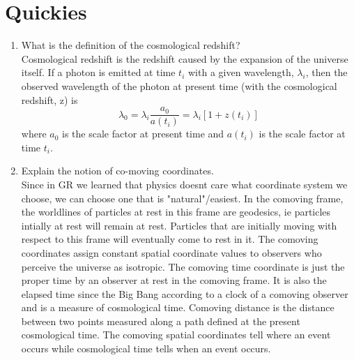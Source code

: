 	\section{Quickies}

\begin{enumerate}[label=(\alph*)]
	\item What is the definition of the cosmological redshift? \\
		Cosmological redshift is the redshift caused by the expansion of the universe itself. If a photon is emitted at time $t_i$ with a given wavelength, $\lambda_i$, then the observed wavelength of the photon at present time (with the cosmological redshift, z) is 
		\begin{equation}
			\lambda_0 = \lambda_i \frac{a_0}{a(t_i)} = \lambda_i \left[ 1 + z(t_i) \right]
		\end{equation}
where $a_0$ is the scale factor at present time and $a(t_i)$ is the scale factor at time $t_i$.

	\item Explain the notion of co-moving coordinates. \\
		Since in GR we learned that physics doesnt care what coordinate system we choose, we can choose one that is "natural"/easiest. 	In the comoving frame, the worldlines of particles at rest in this frame are geodesics, ie particles intially at rest will remain at rest. Particles that are initially moving with respect to this frame will eventually come to rest in it. The comoving coordinates assign constant spatial coordinate values to observers who perceive the universe as isotropic. The comoving time coordinate is just the proper time by an observer at rest in the comoving frame. It is also the elapsed time since the Big Bang according to a clock of a comoving observer and is a measure of cosmological time. Comoving distance is the distance between two points measured along a path defined at the present cosmological time. The comoving spatial coordinates tell where an event occurs while cosmological time tells when an event occurs.
\end{enumerate} 

